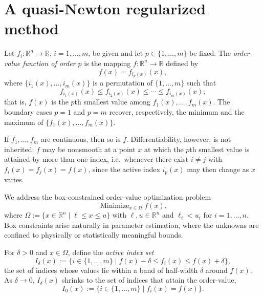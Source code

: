 \documentclass[11pt]{article}
\newcommand{\minimize}{\mathop{\text{Minimize}}}
\begin{document}
\section{A quasi-Newton regularized method} \label{sec:method}

Let $f_i : \mathbb{R}^n \to \mathbb{R}$, $i = 1, \ldots, m$, be given and let
$p \in \{1, \ldots, m\}$ be fixed. The \textit{order-value function of order
$p$} is the mapping $f : \mathbb{R}^n \to \mathbb{R}$ defined by
\begin{equation}
    f(x) = f_{i_p(x)}(x), \label{ovo-function}
\end{equation}
where $\{i_1(x), \ldots, i_m(x)\}$ is a permutation of $\{1, \ldots, m\}$ such
that
\begin{equation}
    f_{i_1(x)}(x) \leq f_{i_2(x)}(x) \leq \cdots \leq f_{i_m(x)}(x);
    \label{fi-sort}
\end{equation}
that is, $f(x)$ is the $p$th smallest value among $f_1(x), \ldots, f_m(x)$.
The boundary cases $p = 1$ and $p = m$ recover, respectively, the minimum and
the maximum of $\{f_1(x), \ldots, f_m(x)\}$.

If $f_1, \ldots, f_m$ are continuous, then so is $f$. Differentiability,
however, is not inherited: $f$ may be nonsmooth at a point $x$ at which the
$p$th smallest value is attained by more than one index, i.e.\ whenever there
exist $i \neq j$ with $f_i(x) = f_j(x) = f(x)$, since the active index $i_p(x)$
may then change as $x$ varies.

We address the box-constrained order-value optimization problem
\begin{equation}
    \minimize_{x \in \Omega} f(x), \label{ovo-problem}
\end{equation}
where $\Omega := \{x \in \mathbb{R}^n \mid \ell \leq x \leq u\}$ with
$\ell, u \in \mathbb{R}^n$ and $\ell_i < u_i$ for $i = 1, \ldots, n$. Box
constraints arise naturally in parameter estimation, where the unknowns are
confined to physically or statistically meaningful bounds.

For $\delta > 0$ and $x \in \Omega$, define the \textit{active index set}
\begin{equation}
    I_\delta(x) := \{i \in \{1, \ldots, m\} \mid
    f(x) - \delta \leq f_i(x) \leq f(x) + \delta\}, \label{idelta}
\end{equation}
the set of indices whose values lie within a band of half-width $\delta$ around
$f(x)$. As $\delta \to 0$, $I_\delta(x)$ shrinks to the set of indices that
attain the order-value,
\begin{equation*}
    I_0(x) := \{i \in \{1, \ldots, m\} \mid f_i(x) = f(x)\}.
\end{equation*}
\end{document}

